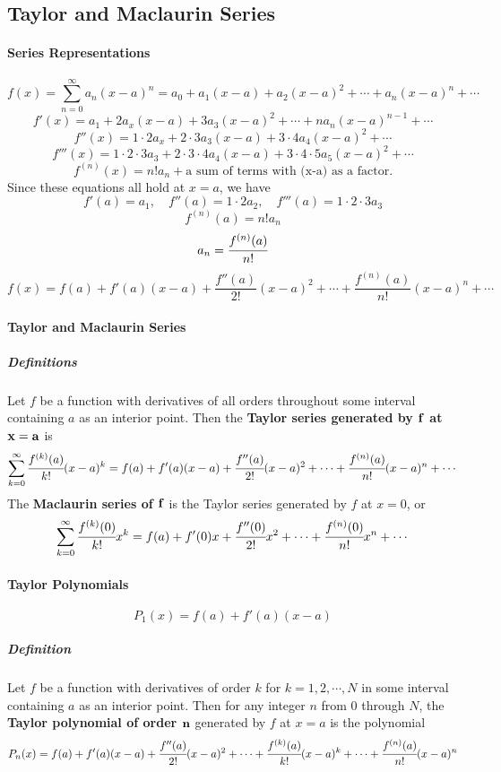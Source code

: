 \documentclass{article}
\begin{document}
        \subsection{Taylor and Maclaurin Series}
            \paragraph{Series Representations}
            \[f(x)=\sum_{n=0}^\infty a_n(x-a)^n=a_0+a_1(x-a)+a_2(x-a)^2+\cdots+a_n(x-a)^n+\cdots\]
            \[f'(x)=a_1+2a_x(x-a)+3a_3(x-a)^2+\cdots+na_n(x-a)^{n-1}+\cdots\]
            \[f''(x)=1\cdot 2a_x+2\cdot 3a_3(x-a)+3\cdot 4a_4(x-a)^2+\cdots\]
            \[f'''(x)=1\cdot 2\cdot 3 a_3+2\cdot 3\cdot 4 a_4(x-a)+3\cdot 4\cdot 5a_5(x-a)^2+\cdots\]
            \[f^{(n)}(x)=n!a_n+\text{a sum of terms with (x-a) as a factor.}\]
            Since these equations all hold at $x=a$, we have
            \[f'(a)=a_1,\quad f''(a)=1\cdot 2a_2,\quad f'''(a)=1\cdot 2\cdot 3 a_3\]
            \[f^{(n)}(a)=n!a_n\]
            \[a_n=\cfrac{f^{(n)}(a)}{n!}\]
            \[f(x)=f(a)+f'(a)(x-a)+\frac{f''(a)}{2!}(x-a)^2+\cdots+\frac{f^{(n)}(a)}{n!}(x-a)^n+\cdots\]
            \paragraph{Taylor and Maclaurin Series}
                \subparagraph{Definitions} Let $f$ be a function with derivatives of all orders throughout some interval containing $a$ as an interior point. Then the \textbf{Taylor series generated by $\bf{f}$ at $\bf{x=a}$} is
                \[\sum_{k=0}^\infty \cfrac{f^{(k)}(a)}{k!}(x-a)^k=f(a)+f'(a)(x-a)+\cfrac{f''(a)}{2!}(x-a)^2+\cdots+\cfrac{f^{(n)}(a)}{n!}(x-a)^n+\cdots\]
                The \textbf{Maclaurin series of $\bf{f}$} is the Taylor series generated by $f$ at $x=0$, or
                \[\sum_{k=0}^\infty \cfrac{f^{(k)}(0)}{k!}x^k=f(a)+f'(0)x+\cfrac{f''(0)}{2!}x^2+\cdots+\cfrac{f^{(n)}(0)}{n!}x^n+\cdots\]
            \paragraph{Taylor Polynomials}
            \[P_1(x)=f(a)+f'(a)(x-a)\]
                \subparagraph{Definition} Let $f$ be a function with derivatives of order $k$ for $k=1,2,\cdots,N$ in some interval containing $a$ as an interior point. Then for any integer $n$ from 0 through $N$, the \textbf{Taylor polynomial of order $\bf{n}$} generated by $f$ at $x=a$ is the polynomial
                \[P_n(x)=f(a)+f'(a)(x-a)+\cfrac{f''(a)}{2!}(x-a)^2+\cdots+\cfrac{f^{(k)}(a)}{k!}(x-a)^k+\cdots+\cfrac{f^{(n)}(a)}{n!}(x-a)^n\]
\end{document}
